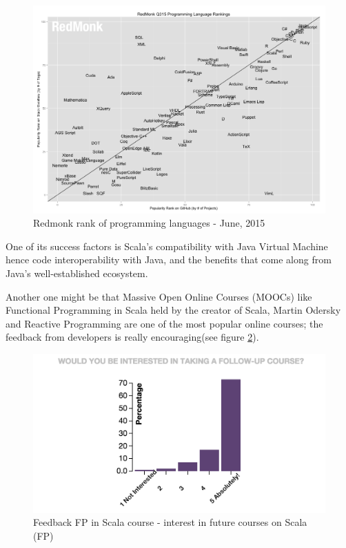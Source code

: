 \documentclass{article}
\begin{document}
\begin{figure}[h!]
  \includegraphics[width=\linewidth]{redmonk-rank.png}
  \caption{Redmonk rank of programming languages - June, 2015}
  \label{fig:redmonk-rank}
\end{figure}

One of its success factors is  Scala's compatibility with Java Virtual Machine hence code interoperability with Java, and the benefits that come along from  Java's well-established ecosystem.\par

 Another one might be that Massive Open Online Courses (MOOCs)  like Functional Programming in Scala \cite{scalastat:1} held  by the creator of Scala, Martin Odersky and Reactive Programming are one of the most popular online courses; the feedback from developers is really encouraging(see figure \ref{fig:interest}). \par

\begin{figure}[h!]
  \includegraphics[width=\linewidth]{interest.png}
  \caption{Feedback FP in Scala course - interest in future courses on Scala (FP)}
  \label{fig:interest}
\end{figure}
\end{document}
